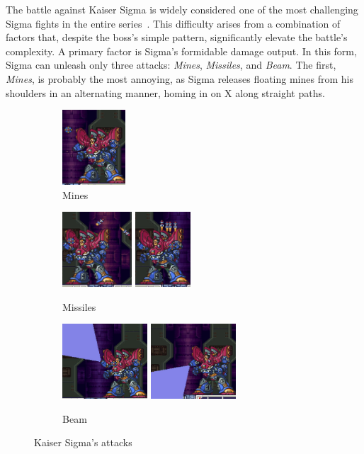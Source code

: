 The battle against Kaiser Sigma is widely considered one of the most challenging Sigma fights in the entire series~\cite{wiki:Sigma3}. This difficulty arises from a combination of factors that, despite the boss's simple pattern, significantly elevate the battle's complexity. A primary factor is Sigma's formidable damage output. In this form, Sigma can unleash only three attacks: \emph{Mines}, \emph{Missiles}, and \emph{Beam}. The first, \emph{Mines}, is probably the most annoying, as Sigma releases floating mines from his shoulders in an alternating manner, homing in on X along straight paths.\begin{figure}[htp]
	\centering
	\begin{subfigure}{.3\linewidth}
		\centering
		\includegraphics[height=2.8cm]{figures/X3/Doppler_stages/kaiser_mine.jpg}
		\caption{Mines}
	\end{subfigure}
	\begin{subfigure}{.4\linewidth}
		\centering
		\includegraphics[height=2.8cm]{figures/X3/Doppler_stages/kaiser_missile_1.jpg}
		\includegraphics[height=2.8cm]{figures/X3/Doppler_stages/kaiser_missile_2.jpg}
		\caption{Missiles}
	\end{subfigure}
	\begin{subfigure}{\linewidth} 
		\centering
		\includegraphics[height=2.8cm]{figures/X3/Doppler_stages/kaiser_beam_1.jpg}
		\includegraphics[height=2.8cm]{figures/X3/Doppler_stages/kaiser_beam_2.jpg}
		\caption{Beam}
	\end{subfigure}
	\caption{Kaiser Sigma's attacks}
\end{figure}
